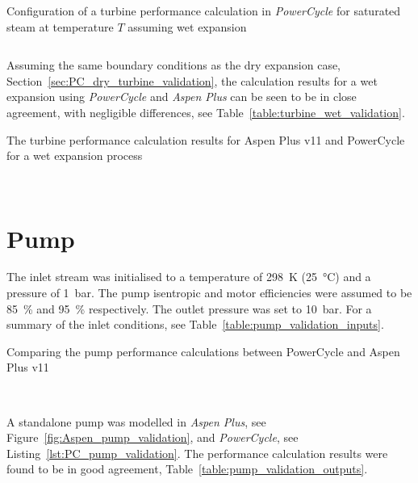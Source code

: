     \begin{listing}[H]
        \caption{Configuration of a turbine performance calculation in \emph{PowerCycle} for saturated steam at temperature \(T\) assuming wet expansion}
        \inputminted[bgcolor=bg,linenos, fontsize=\footnotesize]{python}{Content/Appendices/Appendix_F/Code/TurbineWetPerf_snippet.py}
        \label{lst:PC_turbine_wet_validation}
        \vspace{-20pt}
    \end{listing}

    Assuming the same boundary conditions as the dry expansion case, Section~\ref{sec:PC_dry_turbine_validation}, the calculation results for a wet expansion using \emph{PowerCycle} and \emph{Aspen Plus} can be seen to be in close agreement, with negligible differences, see Table~\ref{table:turbine_wet_validation}.

    \begin{table}[H]
        \caption{The turbine performance calculation results for Aspen Plus v11 and PowerCycle for a wet expansion process}
        \centering 
        \label{table:turbine_wet_validation}
        
        \\[10pt]
    \end{table}

\section{Pump}
    The inlet stream was initialised to a temperature of \qty{298}{\K} (\qty{25}{\degreeCelsius}) and a pressure of \qty{1}{\bar}. The pump isentropic and motor efficiencies were assumed to be \qty{85}{\percent} and \qty{95}{\percent} respectively. The outlet pressure was set to \qty{10}{\bar}. For a summary of the inlet conditions, see Table~\ref{table:pump_validation_inputs}.

    \begin{table}[H]
        \caption{Comparing the pump performance calculations between PowerCycle and Aspen Plus v11}
        \centering 
        \label{table:pump_validation_inputs}
                
        \\[10pt]
    \end{table}

    A standalone pump was modelled in \emph{Aspen Plus}, see Figure~\ref{fig:Aspen_pump_validation}, and \emph{PowerCycle}, see Listing~\ref{lst:PC_pump_validation}. The performance calculation results were found to be in good agreement, Table~\ref{table:pump_validation_outputs}.


